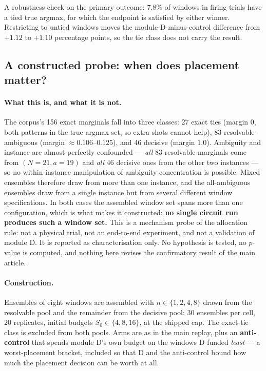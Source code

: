 \documentclass[final,5p,times,longtitle]{elsarticle}
\theoremstyle{plain}
\begin{document}
A robustness check on the primary outcome: $7.8\%$ of windows in firing
trials have a tied true argmax, for which the endpoint is satisfied by
either winner. Restricting to untied windows moves the
module-D-minus-control difference from $+1.12$ to $+1.10$ percentage
points, so the tie class does not carry the result.

\subsection{A constructed probe: when does placement matter?}
\label{si:familyB}

\paragraph{What this is, and what it is not.} The corpus's 156 exact
marginals fall into three classes: 27 exact ties (margin $0$, both patterns
in the true argmax set, so extra shots cannot help), 83
resolvable-ambiguous (margin ${\approx}0.106$--$0.125$), and 46 decisive
(margin $1.0$). Ambiguity and instance are almost perfectly confounded ---
\emph{all} 83 resolvable marginals come from $(N{=}21,a{=}19)$ and
\emph{all} 46 decisive ones from the other two instances --- so no
within-instance manipulation of ambiguity concentration is possible. Mixed
ensembles therefore draw from more than one instance, and the all-ambiguous
ensembles draw from a single instance but from several different window
specifications. In both cases the assembled window set spans more than one
configuration, which is what makes it constructed: \textbf{no single circuit
run produces such a window set.} This is a mechanism probe of the allocation
rule: not a physical trial, not an end-to-end experiment, and not a
validation of module D. It is reported as characterisation only. No
hypothesis is tested, no $p$-value is computed, and nothing here revises
the confirmatory result of the main article.

\paragraph{Construction.} Ensembles of eight windows are assembled with
$n\in\{1,2,4,8\}$ drawn from the resolvable pool and the remainder from the
decisive pool: 30 ensembles per cell, 20 replicates, initial budgets
$S_0\in\{4,8,16\}$, at the shipped cap. The exact-tie class is excluded
from both pools. Arms are as in the main replay, plus an
\textbf{anti-control} that spends module D's own budget on the windows D
funded \emph{least} --- a worst-placement bracket, included so that D and
the anti-control bound how much the placement decision can be worth at all.
\end{document}
